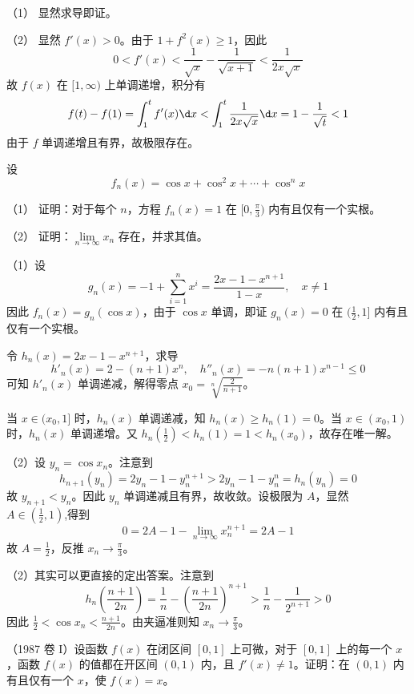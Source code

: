 \begin{solution}
	（1） 显然求导即证。

	（2） 显然 $f'(x) > 0$。由于 $1 + f^2(x) \geqslant 1$，因此
	\[ 0 < f'(x) < \frac{1}{\sqrt{x}} - \frac{1}{\sqrt{x+1}} < \frac{1}{2 x \sqrt{x}} \]
	故 $f(x)$ 在 $[1, \infty)$ 上单调递增，积分有
	\[ f(t) - f(1) = \int_{1}^{t} f'(x) \d x < \int_{1}^{t} \frac{1}{2 x \sqrt{x}} \d x = 1 - \frac{1}{\sqrt{t}} < 1 \]
	由于 $f$ 单调递增且有界，故极限存在。
\end{solution}

\begin{problem}[000020]
设
\[ f_n(x) = \cos x + \cos^2 x + \cdots + \cos^n x \]

（1） 证明：对于每个 $n$，方程 $f_n(x) = 1$ 在 $[0, \frac{\pi}{3})$ 内有且仅有一个实根。

（2） 证明：$\lim\limits_{n \to \infty} x_n$ 存在，并求其值。
\end{problem}

\begin{solution}
	（1）设
	\[ g_n(x) =  - 1 + \sum_{i=1}^n x^i = \frac{2x - 1 - x^{n+1}}{1 - x}, \quad x \neq 1 \]
	因此 $f_n(x) = g_n(\cos x)$，由于 $\cos x$ 单调，即证 $g_n(x) = 0$ 在 $(\frac{1}{2}, 1]$ 内有且仅有一个实根。


	令 $h_n(x) = 2x - 1 - x^{n+1}$，求导
	\[ h'_n(x) = 2 - (n + 1)x^n, \quad h''_n(x) = - n(n+1) x^{n-1} \leqslant 0 \]
	可知 $h'_n(x)$ 单调递减，解得零点 $x_0 = \sqrt[n]{\frac{2}{n + 1}}$。

	当 $x \in (x_0, 1]$ 时，$h_n(x)$ 单调递减，知 $h_n(x) \geqslant h_n(1) = 0$。当 $x \in (x_0, 1)$ 时，$h_n(x)$ 单调递增。又 $h_n(\frac{1}{2}) <  h_n(1) = 1 < h_n(x_0)$，故存在唯一解。

	（2）设 $y_n = \cos x_n$。注意到
	\[ h_{n+1}(y_n) = 2 y_n - 1 - y_{n}^{n+1} > 2 y_n - 1 - y_{n}^n = h_n(y_n) = 0 \]
	故 $y_{n+1} < y_{n}$。因此 $y_n$ 单调递减且有界，故收敛。设极限为 $A$，显然 $A \in (\frac{1}{2}, 1)$,得到
	\[ 0 = 2A - 1 - \lim_{n \to \infty} x_n^{n+1} = 2A - 1 \]
	故 $A = \frac{1}{2}$，反推 $x_n \to \frac{\pi}{3}$。

	（2）其实可以更直接的定出答案。注意到
	\[ h_n\left(\frac{n + 1}{2n}\right) = \frac{1}{n} - \left(\frac{n + 1}{2n}\right)^{n+1} > \frac{1}{n} - \frac{1}{2^{n+1}} > 0 \]
	因此 $\frac{1}{2} < \cos x_n < \frac{n + 1}{2n}$。由夹逼准则知 $x_n \to \frac{\pi}{3}$。

\end{solution}

\begin{problem}[000021]
（1987 卷 I）设函数 $f(x)$ 在闭区间 $[0,1]$ 上可微，对于 $[0, 1]$ 上的每一个 $x$，函数 $f(x)$ 的值都在开区间 $(0, 1)$ 内，且 $f'(x) \neq 1$。证明：在 $(0, 1)$ 内有且仅有一个 $x$，使 $f(x) = x$。
\end{problem}

